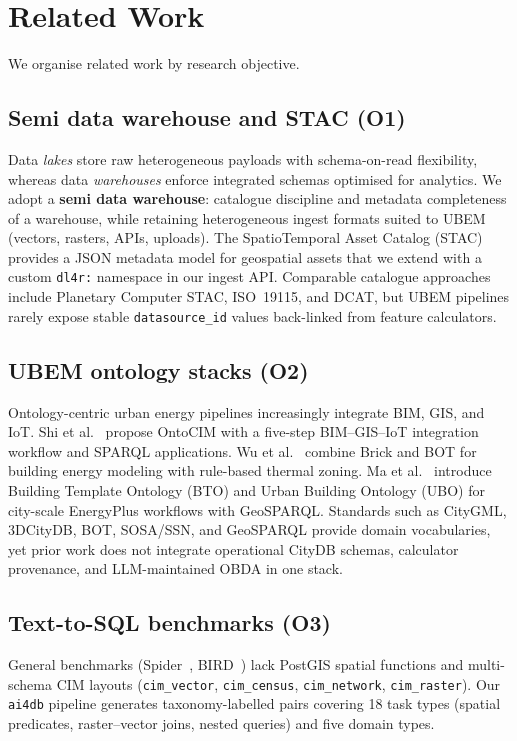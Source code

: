 \section{Related Work}
\label{sec:related}

We organise related work by research objective.

\subsection{Semi data warehouse and STAC (O1)}

Data \emph{lakes} store raw heterogeneous payloads with schema-on-read flexibility, whereas data \emph{warehouses} enforce integrated schemas optimised for analytics.
We adopt a \textbf{semi data warehouse}: catalogue discipline and metadata completeness of a warehouse, while retaining heterogeneous ingest formats suited to UBEM (vectors, rasters, APIs, uploads).
The SpatioTemporal Asset Catalog (STAC)~\cite{stacspec} provides a JSON metadata model for geospatial assets that we extend with a custom \texttt{dl4r:} namespace in our ingest API.
Comparable catalogue approaches include Planetary Computer STAC, ISO~19115, and DCAT, but UBEM pipelines rarely expose stable \texttt{datasource\_id} values back-linked from feature calculators.

\subsection{UBEM ontology stacks (O2)}

Ontology-centric urban energy pipelines increasingly integrate BIM, GIS, and IoT.
Shi et al.~\cite{shi2023cim} propose OntoCIM with a five-step BIM--GIS--IoT integration workflow and SPARQL applications.
Wu et al.~\cite{wu2023bem} combine Brick and BOT for building energy modeling with rule-based thermal zoning.
Ma et al.~\cite{ma2024ubem} introduce Building Template Ontology (BTO) and Urban Building Ontology (UBO) for city-scale EnergyPlus workflows with GeoSPARQL.
Standards such as CityGML, 3DCityDB, BOT, SOSA/SSN, and GeoSPARQL provide domain vocabularies, yet prior work does not integrate operational CityDB schemas, calculator provenance, and LLM-maintained OBDA in one stack.

\subsection{Text-to-SQL benchmarks (O3)}

General benchmarks (Spider~\cite{yu2018spider}, BIRD~\cite{li2023bird}) lack PostGIS spatial functions and multi-schema CIM layouts (\texttt{cim\_vector}, \texttt{cim\_census}, \texttt{cim\_network}, \texttt{cim\_raster}).
Our \texttt{ai4db} pipeline generates taxonomy-labelled pairs covering 18 task types (spatial predicates, raster--vector joins, nested queries) and five domain types.

